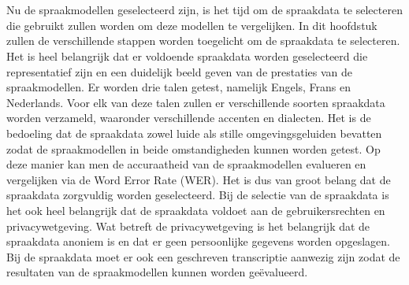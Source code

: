 
\chapter{}%
\label{ch:Selectie van spraakdata}

Nu de spraakmodellen geselecteerd zijn, is het tijd om de spraakdata te selecteren die gebruikt zullen worden om deze modellen te vergelijken. In dit hoofdstuk zullen de verschillende stappen worden toegelicht om de spraakdata te selecteren. Het is heel belangrijk dat er voldoende spraakdata worden geselecteerd die representatief zijn en een duidelijk beeld geven van de prestaties van de spraakmodellen. Er worden drie talen getest, namelijk Engels, Frans en Nederlands. Voor elk van deze talen zullen er verschillende soorten spraakdata worden verzameld, waaronder verschillende accenten en dialecten. Het is de bedoeling dat de spraakdata zowel luide als stille omgevingsgeluiden bevatten zodat de spraakmodellen in beide omstandigheden kunnen worden getest. Op deze manier kan men de accuraatheid van de spraakmodellen evalueren en vergelijken via de Word Error Rate (WER). Het is dus van groot belang dat de spraakdata zorgvuldig worden geselecteerd. Bij de selectie van de spraakdata is het ook heel belangrijk dat de spraakdata voldoet aan de gebruikersrechten en privacywetgeving. Wat betreft de privacywetgeving is het belangrijk dat de spraakdata anoniem is en dat er geen persoonlijke gegevens worden opgeslagen. Bij de spraakdata moet er ook een geschreven transcriptie aanwezig zijn zodat de resultaten van de spraakmodellen kunnen worden geëvalueerd.